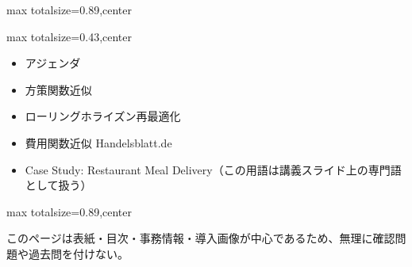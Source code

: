 \begin{minipage}[t]{0.58\textwidth}
\begin{adjustbox}{max totalsize={\textwidth}{0.89\textheight},center}
\begin{minipage}{\textwidth}
\end{minipage}
\end{adjustbox}
\end{minipage}


\clearpage
{}
\begin{minipage}[t]{0.405\textwidth}
\begin{adjustbox}{max totalsize={\textwidth}{0.43\textheight},center}
\begin{minipage}{\textwidth}\scriptsize
{}\begin{itemize}
\item アジェンダ
\item 方策関数近似
\item ローリングホライズン再最適化
\item 費用関数近似 Handelsblatt.de
\item Case Study: Restaurant Meal Delivery（この用語は講義スライド上の専門語として扱う）
\end{itemize}
\end{minipage}
\end{adjustbox}
\end{minipage}\hfill
\begin{minipage}[t]{0.58\textwidth}
\begin{adjustbox}{max totalsize={\textwidth}{0.89\textheight},center}
\begin{minipage}{\textwidth}\scriptsize
{}このページは表紙・目次・事務情報・導入画像が中心であるため、無理に確認問題や過去問を付けない。
\end{minipage}
\end{adjustbox}
\end{minipage}


